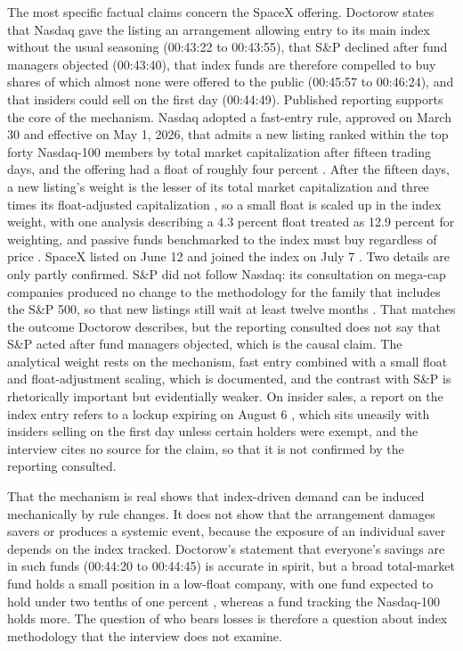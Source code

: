 \documentclass[12pt]{article}
\newcommand{\ts}[1]{(#1)}
\begin{document}
The most specific factual claims concern the SpaceX offering. Doctorow states that Nasdaq gave the listing an arrangement allowing entry to its main index without the usual seasoning \ts{00:43:22 to 00:43:55}, that S\&P declined after fund managers objected \ts{00:43:40}, that index funds are therefore compelled to buy shares of which almost none were offered to the public \ts{00:45:57 to 00:46:24}, and that insiders could sell on the first day \ts{00:44:49}. Published reporting supports the core of the mechanism. Nasdaq adopted a fast-entry rule, approved on March 30 and effective on May 1, 2026, that admits a new listing ranked within the top forty Nasdaq-100 members by total market capitalization after fifteen trading days, and the offering had a float of roughly four percent \cite{morningstar}. After the fifteen days, a new listing's weight is the lesser of its total market capitalization and three times its float-adjusted capitalization \cite{morningstar}, so a small float is scaled up in the index weight, with one analysis describing a 4.3 percent float treated as 12.9 percent for weighting, and passive funds benchmarked to the index must buy regardless of price \cite{cme}. SpaceX listed on June 12 and joined the index on July 7 \cite{ibtimes}. Two details are only partly confirmed. S\&P did not follow Nasdaq: its consultation on mega-cap companies produced no change to the methodology for the family that includes the S\&P 500, so that new listings still wait at least twelve months \cite{cboe,northerntrust}. That matches the outcome Doctorow describes, but the reporting consulted does not say that S\&P acted after fund managers objected, which is the causal claim. The analytical weight rests on the mechanism, fast entry combined with a small float and float-adjustment scaling, which is documented, and the contrast with S\&P is rhetorically important but evidentially weaker. On insider sales, a report on the index entry refers to a lockup expiring on August 6 \cite{ibtimes}, which sits uneasily with insiders selling on the first day unless certain holders were exempt, and the interview cites no source for the claim, so that it is not confirmed by the reporting consulted.

That the mechanism is real shows that index-driven demand can be induced mechanically by rule changes. It does not show that the arrangement damages savers or produces a systemic event, because the exposure of an individual saver depends on the index tracked. Doctorow's statement that everyone's savings are in such funds \ts{00:44:20 to 00:44:45} is accurate in spirit, but a broad total-market fund holds a small position in a low-float company, with one fund expected to hold under two tenths of one percent \cite{morningstar}, whereas a fund tracking the Nasdaq-100 holds more. The question of who bears losses is therefore a question about index methodology that the interview does not examine.
\end{document}
